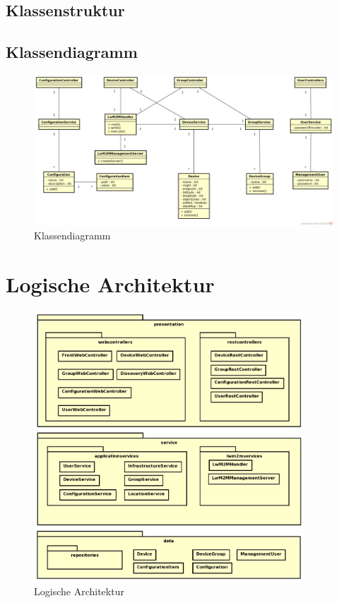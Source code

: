 \begin{landscape}
\section{Klassenstruktur}
\subsection{Klassendiagramm}
\begin{figure}[H]
\centering
\includegraphics[width=1\textwidth]{../03_Design/images/domainmodel.png}
\caption{Klassendiagramm}
\end{figure}
\end{landscape}

\section{Logische Architektur}
\begin{figure} [H]
	\begin{center}
	\includegraphics[width=0.90\textwidth]{../03_Design/images/architektur.png}
	\caption{Logische Architektur}
	\end{center}
\end{figure}

